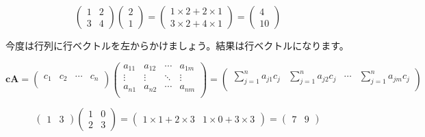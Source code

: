 \documentclass{ltjsbook}
\begin{document}
\begin{equation*}
	\begin{pmatrix}
		1 & 2 \\ 3 & 4
	\end{pmatrix}
	\begin{pmatrix}
		2 \\1
	\end{pmatrix}
	=
	\begin{pmatrix}
		1 \times 2 + 2 \times 1 \\
		3 \times 2 + 4 \times 1
	\end{pmatrix}
	=
	\begin{pmatrix}
		4 \\10
	\end{pmatrix}
\end{equation*}


今度は行列に行ベクトルを左からかけましょう。結果は行ベクトルになります。

\begin{equation*}
	\bm{c} \bm{A} =
	\begin{pmatrix}
		c_1 & c_2 & \cdots & c_n \\
	\end{pmatrix}
	\begin{pmatrix}
		a_{11} & a_{12} & \cdots & a_{1m} \\
		\vdots & \vdots & \ddots & \vdots \\
		a_{n1} & a_{n2} & \cdots & a_{nm} \\
	\end{pmatrix}
	=
	\begin{pmatrix}
		\displaystyle{\sum_{j=1}^{n}a_{j1}c_{j}} & \displaystyle{\sum_{j=1}^{n} a_{j2}c_{j}} & \cdots & \displaystyle{\sum_{j=1}^{n} a_{jm}c_{j}} \\
	\end{pmatrix}
\end{equation*}

\begin{equation*}
	\begin{pmatrix}
		1 & 3
	\end{pmatrix}
	\begin{pmatrix}
		1 & 0 \\
		2 & 3
	\end{pmatrix}
	=
	\begin{pmatrix}
		1 \times 1 + 2 \times 3 & 1\times 0+3 \times 3
	\end{pmatrix}
	=
	\begin{pmatrix}
		7 & 9
	\end{pmatrix}
\end{equation*}
\end{document}
